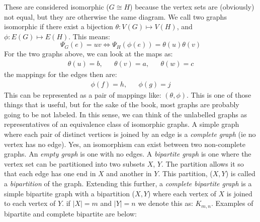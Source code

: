 \documentclass{article}
\begin{document}
\indent{} These are considered isomorphic ($G \cong H$) because the vertex sets are (obviously) not equal, but they are otherwise the same diagram. We call two graphs isomorphic if
there exist a bijection $\theta: V(G) \mapsto V(H)$, and $\phi: E(G) \mapsto E(H)$.
This means:
\[\Psi_G(e) = uv \iff \Psi_H(\phi(e)) = \theta(u)\theta(v)\]
For the two graphs above, we can look at the maps as:
\begin{align*}
    \theta(u) = b, && \theta(v) = a, && \theta(w) = c
\end{align*}
the mappings for the edges then are:
\begin{align*}
    \phi(f) = h, && \phi(g) =j
\end{align*}
\indent{} This can be represented as a pair of mappings like: $(\theta, \phi)$. This is one of those things that is useful, but for the sake of the book, most graphs are probably going to be not labeled.
In this sense, we can think of the unlabelled graphs as representatives of an equivalence class of isomorphic graphs.
\newline
\indent{} A simple graph where each pair of distinct vertices is joined by an edge is a \emph{complete graph} (ie no vertex has no edge). Yes, an isomorphism can exist between two non-complete graphs. An \emph{empty graph} is one with no edges. A \emph{bipartite graph} is one where
the vertex set can be partitioned into two subsets $X$, $Y$. The partition allows it so that each edge has one end in $X$ and another in $Y$. This partition, ($X, Y$) is called a \emph{bipartition} of the graph. Extending this further, a \emph{complete bipartite graph} is a simple bipartite graph with a bipartition ($X, Y$) where each vertex of $X$ is joined to each vertex of $Y$.
if $\left|X\right| = m$ and $\left|Y\right| = n$ we denote this as: $K_{m,n}$.
\newline
\indent{} Examples of bipartite and complete bipartite are below:
\end{document}
